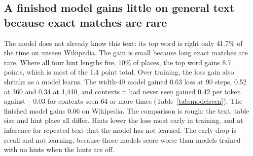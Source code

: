 \documentclass[11pt]{article}
\begin{document}
\subsection{A finished model gains little on general text because exact matches are rare}
The model does not already know this text: its top word is right only 41.7\% of the time on unseen Wikipedia. The gain is small because long exact matches are rare. Where all four hint lengths fire, 10\% of places, the top word gains 8.7 points, which is most of the 1.4 point total. Over training, the loss gain also shrinks as a model learns. The width-40 model gained 0.63 loss at 90 steps, 0.52 at 360 and 0.34 at 1,440, and contexts it had never seen gained 0.42 per token against $-$0.03 for contexts seen 64 or more times (Table~\ref{tab:modelseen}). The finished model gains 0.06 on Wikipedia. The comparison is rough: the text, table size and hint place all differ. Hints lower the loss most early in training, and at inference for repeated text that the model has not learned. The early drop is recall and not learning, because those models score worse than models trained with no hints when the hints are off.
\end{document}
